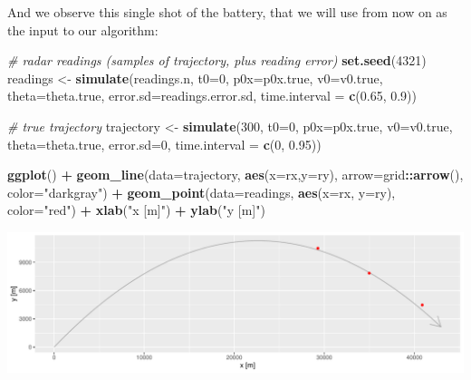 \documentclass[]{article}
\newenvironment{Shaded}{\begin{snugshade}}{\end{snugshade}}
\newcommand{\CommentTok}[1]{\textcolor[rgb]{0.56,0.35,0.01}{\textit{#1}}}
\newcommand{\DataTypeTok}[1]{\textcolor[rgb]{0.13,0.29,0.53}{#1}}
\newcommand{\DecValTok}[1]{\textcolor[rgb]{0.00,0.00,0.81}{#1}}
\newcommand{\FloatTok}[1]{\textcolor[rgb]{0.00,0.00,0.81}{#1}}
\newcommand{\KeywordTok}[1]{\textcolor[rgb]{0.13,0.29,0.53}{\textbf{#1}}}
\newcommand{\NormalTok}[1]{#1}
\newcommand{\OperatorTok}[1]{\textcolor[rgb]{0.81,0.36,0.00}{\textbf{#1}}}
\newcommand{\StringTok}[1]{\textcolor[rgb]{0.31,0.60,0.02}{#1}}
\begin{document}
And we observe this single shot of the battery, that we will use from
now on as the input to our algorithm:

\begin{Shaded}
\begin{Highlighting}[]
\CommentTok{# radar readings (samples of trajectory, plus reading error)}
\KeywordTok{set.seed}\NormalTok{(}\DecValTok{4321}\NormalTok{)}
\NormalTok{readings <-}\StringTok{ }\KeywordTok{simulate}\NormalTok{(readings.n, }
                     \DataTypeTok{t0=}\DecValTok{0}\NormalTok{, }\DataTypeTok{p0x=}\NormalTok{p0x.true, }\DataTypeTok{v0=}\NormalTok{v0.true, }\DataTypeTok{theta=}\NormalTok{theta.true, }
                     \DataTypeTok{error.sd=}\NormalTok{readings.error.sd,}
                     \DataTypeTok{time.interval =} \KeywordTok{c}\NormalTok{(}\FloatTok{0.65}\NormalTok{, }\FloatTok{0.9}\NormalTok{))  }

\CommentTok{# true trajectory}
\NormalTok{trajectory <-}\StringTok{ }\KeywordTok{simulate}\NormalTok{(}\DecValTok{300}\NormalTok{, }
                       \DataTypeTok{t0=}\DecValTok{0}\NormalTok{, }\DataTypeTok{p0x=}\NormalTok{p0x.true, }\DataTypeTok{v0=}\NormalTok{v0.true, }\DataTypeTok{theta=}\NormalTok{theta.true, }
                       \DataTypeTok{error.sd=}\DecValTok{0}\NormalTok{,}
                       \DataTypeTok{time.interval =} \KeywordTok{c}\NormalTok{(}\DecValTok{0}\NormalTok{, }\FloatTok{0.95}\NormalTok{))}

\KeywordTok{ggplot}\NormalTok{() }\OperatorTok{+}\StringTok{ }
\StringTok{  }\KeywordTok{geom_line}\NormalTok{(}\DataTypeTok{data=}\NormalTok{trajectory, }\KeywordTok{aes}\NormalTok{(}\DataTypeTok{x=}\NormalTok{rx,}\DataTypeTok{y=}\NormalTok{ry), }\DataTypeTok{arrow=}\NormalTok{grid}\OperatorTok{::}\KeywordTok{arrow}\NormalTok{(), }\DataTypeTok{color=}\StringTok{"darkgray"}\NormalTok{) }\OperatorTok{+}
\StringTok{  }\KeywordTok{geom_point}\NormalTok{(}\DataTypeTok{data=}\NormalTok{readings, }\KeywordTok{aes}\NormalTok{(}\DataTypeTok{x=}\NormalTok{rx, }\DataTypeTok{y=}\NormalTok{ry), }\DataTypeTok{color=}\StringTok{"red"}\NormalTok{) }\OperatorTok{+}
\StringTok{  }\KeywordTok{xlab}\NormalTok{(}\StringTok{"x [m]"}\NormalTok{) }\OperatorTok{+}\StringTok{ }\KeywordTok{ylab}\NormalTok{(}\StringTok{"y [m]"}\NormalTok{)}
\end{Highlighting}
\end{Shaded}

\begin{center}\includegraphics[width=1.0\textwidth]{bayesian_artillery_files/figure-latex/simulate-1} \end{center}
\end{document}
